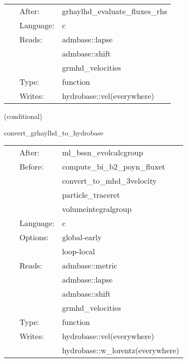 \hspace{5mm}

 \begin{tabular*}{160mm}{cll} 
~ & After:  & grhaylhd\_evaluate\_fluxes\_rhs \\ 
~ & Language:  & c \\ 
~ & Reads:  & admbase::lapse \\ 
~& ~ &admbase::shift\\ 
~& ~ &grmhd\_velocities\\ 
~ & Type:  & function \\ 
~ & Writes:  & hydrobase::vel(everywhere) \\ 
\end{tabular*} 


\vspace{5mm}

   (conditional) 

\hspace{5mm} convert\_grhaylhd\_to\_hydrobase 

\hspace{5mm}{\it convert grhaylhd-native variables to hydrobase } 


\hspace{5mm}

 \begin{tabular*}{160mm}{cll} 
~ & After:  & ml\_bssn\_evolcalcgroup \\ 
~ & Before:  & compute\_bi\_b2\_poyn\_fluxet \\ 
~& ~ &convert\_to\_mhd\_3velocity\\ 
~& ~ &particle\_traceret\\ 
~& ~ &volumeintegralgroup\\ 
~ & Language:  & c \\ 
~ & Options:  & global-early \\ 
~& ~ &loop-local\\ 
~ & Reads:  & admbase::metric \\ 
~& ~ &admbase::lapse\\ 
~& ~ &admbase::shift\\ 
~& ~ &grmhd\_velocities\\ 
~ & Type:  & function \\ 
~ & Writes:  & hydrobase::vel(everywhere) \\ 
~& ~ &hydrobase::w\_lorentz(everywhere)\\ 
\end{tabular*} 


\vspace{5mm}


